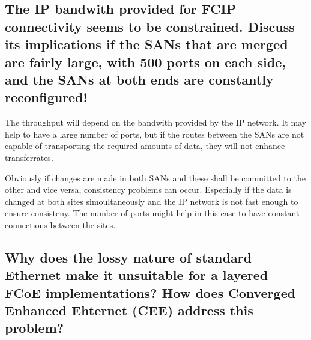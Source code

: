 \documentclass{article}
\begin{document}
\subsection{The IP bandwith provided for FCIP connectivity seems to be constrained.
	Discuss its implications if the SANs that are merged are fairly large,
	with 500 ports on each side, and the SANs at both ends are constantly reconfigured!}

	The throughput will depend on the bandwith provided by the IP network.
	It may help to have a large number of ports,
	but if the routes between the SANs are not capable of transporting 
	the required amounts of data,
	they will not enhance transferrates.

	Obviously if changes are made in both SANs
	and these shall be committed to the other and vice versa,
	consistency problems can occur.
	Especially if the data is changed at both sites simoultaneously
	and the IP network is not fast enough to ensure consisteny.
	The number of ports might help in this case to have constant connections between the sites.

\subsection{Why does the lossy nature of standard Ethernet make it unsuitable for a layered FCoE implementations?
	How does Converged Enhanced Ehternet (CEE) address this problem?}
\end{document}
